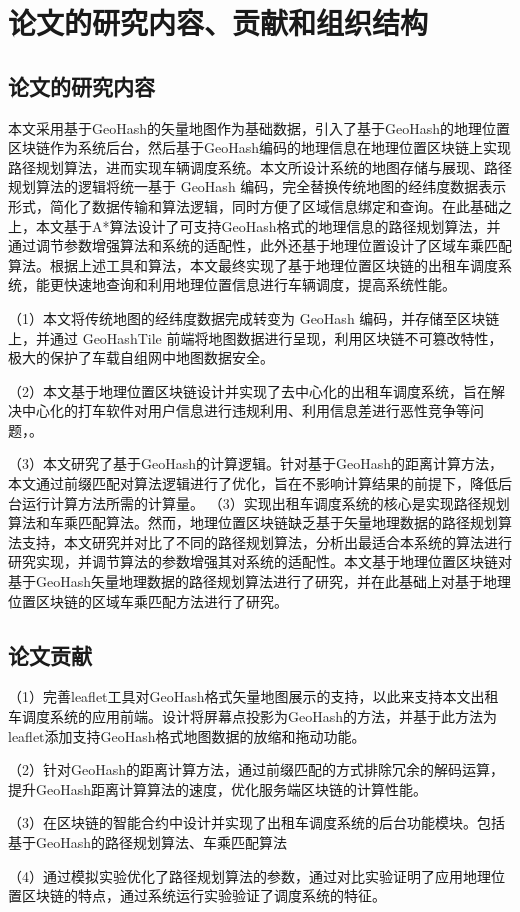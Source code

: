 \section{论文的研究内容、贡献和组织结构}
\subsection{论文的研究内容}

本文采用基于GeoHash的矢量地图作为基础数据，引入了基于GeoHash的地理位置区块链作为系统后台，然后基于GeoHash编码的地理信息在地理位置区块链上实现路径规划算法，进而实现车辆调度系统。本文所设计系统的地图存储与展现、路径规划算法的逻辑将统一基于 GeoHash 编码，完全替换传统地图的经纬度数据表示形式，简化了数据传输和算法逻辑，同时方便了区域信息绑定和查询。在此基础之上，本文基于A*算法设计了可支持GeoHash格式的地理信息的路径规划算法，并通过调节参数增强算法和系统的适配性，此外还基于地理位置设计了区域车乘匹配算法。根据上述工具和算法，本文最终实现了基于地理位置区块链的出租车调度系统，能更快速地查询和利用地理位置信息进行车辆调度，提高系统性能。

（1）本文将传统地图的经纬度数据完成转变为 GeoHash 编码，并存储至区块链上，并通过 GeoHashTile 前端将地图数据进行呈现，利用区块链不可篡改特性，极大的保护了车载自组网中地图数据安全。\par
（2）本文基于地理位置区块链设计并实现了去中心化的出租车调度系统，旨在解决中心化的打车软件对用户信息进行违规利用、利用信息差进行恶性竞争等问题，。\par
（3）本文研究了基于GeoHash的计算逻辑。针对基于GeoHash的距离计算方法，本文通过前缀匹配对算法逻辑进行了优化，旨在不影响计算结果的前提下，降低后台运行计算方法所需的计算量。
（3）实现出租车调度系统的核心是实现路径规划算法和车乘匹配算法。然而，地理位置区块链缺乏基于矢量地理数据的路径规划算法支持，本文研究并对比了不同的路径规划算法，分析出最适合本系统的算法进行研究实现，并调节算法的参数增强其对系统的适配性。本文基于地理位置区块链对基于GeoHash矢量地理数据的路径规划算法进行了研究，并在此基础上对基于地理位置区块链的区域车乘匹配方法进行了研究。\par

\subsection{论文贡献}
（1）完善leaflet工具对GeoHash格式矢量地图展示的支持，以此来支持本文出租车调度系统的应用前端。设计将屏幕点投影为GeoHash的方法，并基于此方法为leaflet添加支持GeoHash格式地图数据的放缩和拖动功能。\par
（2）针对GeoHash的距离计算方法，通过前缀匹配的方式排除冗余的解码运算，提升GeoHash距离计算算法的速度，优化服务端区块链的计算性能。\par
（3）在区块链的智能合约中设计并实现了出租车调度系统的后台功能模块。包括基于GeoHash的路径规划算法、车乘匹配算法\par
（4）通过模拟实验优化了路径规划算法的参数，通过对比实验证明了应用地理位置区块链的特点，通过系统运行实验验证了调度系统的特征。


